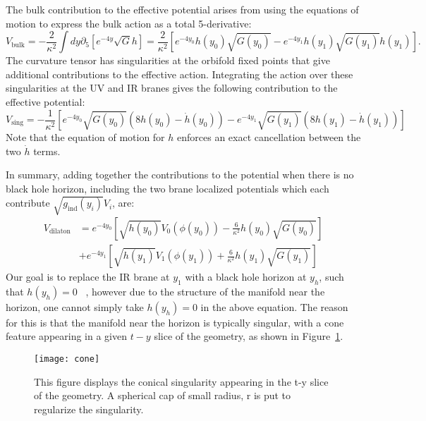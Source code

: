 \documentclass[12pt]{article}
\begin{document}
The bulk contribution to the effective potential arises from using the equations of motion to express the bulk action as a total 5-derivative:
\begin{equation}
V_\text{bulk} = -\frac{2}{\kappa^2} \int d y \partial_5 \left[ e^{-4y} \sqrt{G} h \right] = \frac{2}{\kappa^2} \left [e^{-4 y_0} h(y_0) \sqrt{G(y_0)} - e^{-4 y_1} h(y_1) \sqrt{G(y_1)} h(y_1) \right].
\end{equation}
The curvature tensor has singularities at the orbifold fixed points that give additional contributions to the effective action.  Integrating the action over these singularities at the UV and IR branes gives the following contribution to the effective potential:
\begin{equation}
V_\text{sing} = - \frac{1}{\kappa^2} \left[  e^{-4 y_0} \sqrt{G(y_0)} \left(  8 h(y_0)  - \dot{h}(y_0) \right) - e^{-4 y_1} \sqrt{G(y_1)} \left(  8 h(y_1)  - \dot{h}(y_1) \right) \right]
\end{equation}
Note that the equation of motion for $h$ enforces an exact cancellation between the two $\dot{h}$ terms.

In summary, adding together the contributions to the potential when there is no black hole horizon, including the two brane localized potentials which each contribute $\sqrt{g_\text{ind}(y_i)} V_i$, are:
\begin{align}
V_\text{dilaton} &= e^{-4y_0} \left[ \sqrt{h(y_0)} V_0(\phi(y_0)) - \frac{6}{\kappa^2} h(y_0) \sqrt{G(y_0)} \right] \nonumber \\
&+e^{-4y_1}  \left[  \sqrt{h(y_1)} V_1(\phi(y_1)) + \frac{6}{\kappa^2}  h(y_1) \sqrt{G(y_1)} \right]
\label{eq:hotdilpot}
\end{align}
Our goal is to replace the IR brane at $y_1$ with a black hole horizon at $y_h$, such that $h(y_h)=0$ ~\cite{ArkaniHamed:2000ds}, however due to the structure of the manifold near the horizon, one cannot simply take $h(y_h) = 0$ in the above equation.  The reason for this is that the manifold near the horizon is typically singular, with a cone feature appearing in a given $t-y$ slice of the geometry, as shown in Figure~\ref{fig:conical}.

\begin{figure}[!htbp]
	\center
\texttt{[image: cone]}
\caption{This figure displays the conical singularity appearing in the t-y slice of the geometry. A spherical cap of small radius, r is put to regularize the singularity. }
\label{fig:conical}
\end{figure}
\end{document}
